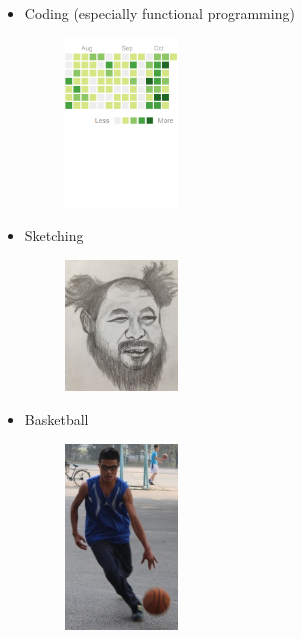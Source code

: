 \documentclass{res}
\begin{document}
\begin{resume}
\begin{itemize}
\item Coding (especially functional programming)
\begin{figure} [H]
\centering
 \includegraphics[width=3cm]{coding.png}
\end{figure}
\item Sketching
\begin{figure} [H]
\centering
 \includegraphics[width=3cm]{sketching.png}
\end{figure}
\item Basketball
\begin{figure} [H]
\centering
 \includegraphics[width=3cm]{basketball.png}
\end{figure}
\end{itemize}



\end{resume}
\end{document}
